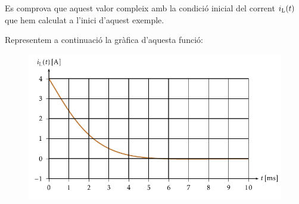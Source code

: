 \begin{exemple}
Es comprova que aquest valor compleix amb la condici\'{o} inicial del
corrent $i_\mathrm{L}(t)$ que hem calculat a l'inici d'aquest exemple.

Representem a continuaci\'{o} la gr\`{a}fica d'aquesta funci\'{o}:
\begin{figure}[h]
\centering
  \includegraphics{Imatges/Cap-Laplace-Exemple3-Corrent.pdf}
\end{figure}

\end{exemple}


